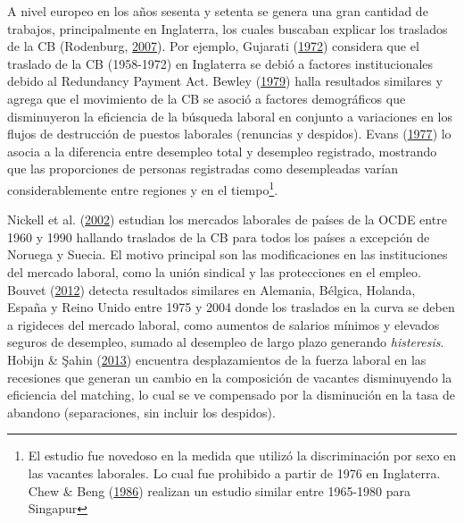 \documentclass[12pt,oneside]{reedthesis}
\begin{document}
A nivel europeo en los años sesenta y setenta se genera una gran cantidad de trabajos, principalmente en Inglaterra, los cuales buscaban explicar los traslados de la CB (Rodenburg, \protect\hyperlink{ref-Rodenburg2007}{2007}). Por ejemplo, Gujarati (\protect\hyperlink{ref-Gujarati1972}{1972}) considera que el traslado de la CB (1958-1972) en Inglaterra se debió a factores institucionales debido al Redundancy Payment Act. Bewley (\protect\hyperlink{ref-Bewley1979}{1979}) halla resultados similares y agrega que el movimiento de la CB se asoció a factores demográficos que disminuyeron la eficiencia de la búsqueda laboral en conjunto a variaciones en los flujos de destrucción de puestos laborales (renuncias y despidos). Evans (\protect\hyperlink{ref-Evans1977}{1977}) lo asocia a la diferencia entre desempleo total y desempleo registrado, mostrando que las proporciones de personas registradas como desempleadas varían considerablemente entre regiones y en el tiempo\footnote{El estudio fue novedoso en la medida que utilizó la discriminación por sexo en las vacantes laborales. Lo cual fue prohibido a partir de 1976 en Inglaterra. Chew \& Beng (\protect\hyperlink{ref-Chew1986}{1986}) realizan un estudio similar entre 1965-1980 para Singapur}.

Nickell et al. (\protect\hyperlink{ref-Nickell2002}{2002}) estudian los mercados laborales de países de la OCDE entre 1960 y 1990 hallando traslados de la CB para todos los países a excepción de Noruega y Suecia. El motivo principal son las modificaciones en las instituciones del mercado laboral, como la unión sindical y las protecciones en el empleo. Bouvet (\protect\hyperlink{ref-Bouvet2012}{2012}) detecta resultados similares en Alemania, Bélgica, Holanda, España y Reino Unido entre 1975 y 2004 donde los traslados en la curva se deben a rigideces del mercado laboral, como aumentos de salarios mínimos y elevados seguros de desempleo, sumado al desempleo de largo plazo generando \emph{histeresis}. Hobijn \& Şahin (\protect\hyperlink{ref-Hobijn2013}{2013}) encuentra desplazamientos de la fuerza laboral en las recesiones que generan un cambio en la composición de vacantes disminuyendo la eficiencia del matching, lo cual se ve compensado por la disminución en la tasa de abandono (separaciones, sin incluir los despidos).
\end{document}
